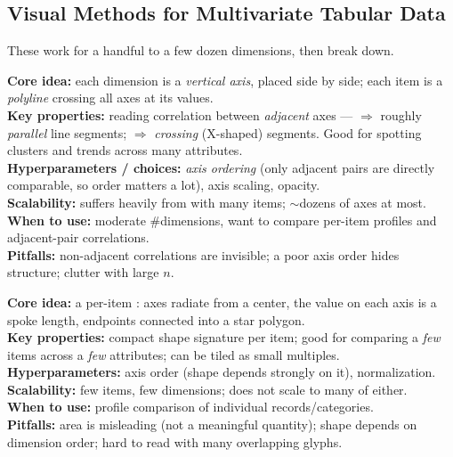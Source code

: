 \subsection{Visual Methods for Multivariate Tabular Data}

These work for a handful to a few dozen dimensions, then break down.

\begin{algobox}
\textbf{Core idea:} each dimension is a \emph{vertical axis}, placed side by side;
each item is a \emph{polyline} crossing all axes at its values.\\
\textbf{Key properties:} reading correlation between \emph{adjacent} axes ---
 $\Rightarrow$ roughly \emph{parallel} line segments;
 $\Rightarrow$ \emph{crossing} (X-shaped) segments.
Good for spotting clusters and trends across many attributes.\\
\textbf{Hyperparameters / choices:} \emph{axis ordering} (only adjacent pairs are
directly comparable, so order matters a lot), axis scaling, opacity.\\
\textbf{Scalability:} suffers heavily from  with many items;
$\sim$dozens of axes at most.\\
\textbf{When to use:} moderate \#dimensions, want to compare per-item profiles
and adjacent-pair correlations.\\
\textbf{Pitfalls:} non-adjacent correlations are invisible; a poor axis order
hides structure; clutter with large $n$.
\end{algobox}

\begin{algobox}
\textbf{Core idea:} a per-item : axes radiate from a center, the
value on each axis is a spoke length, endpoints connected into a star polygon.\\
\textbf{Key properties:} compact shape signature per item; good for comparing a
\emph{few} items across a \emph{few} attributes; can be tiled as small multiples.\\
\textbf{Hyperparameters:} axis order (shape depends strongly on it), normalization.\\
\textbf{Scalability:} few items, few dimensions; does not scale to many of either.\\
\textbf{When to use:} profile comparison of individual records/categories.\\
\textbf{Pitfalls:} area is misleading (not a meaningful quantity); shape depends
on dimension order; hard to read with many overlapping glyphs.
\end{algobox}

